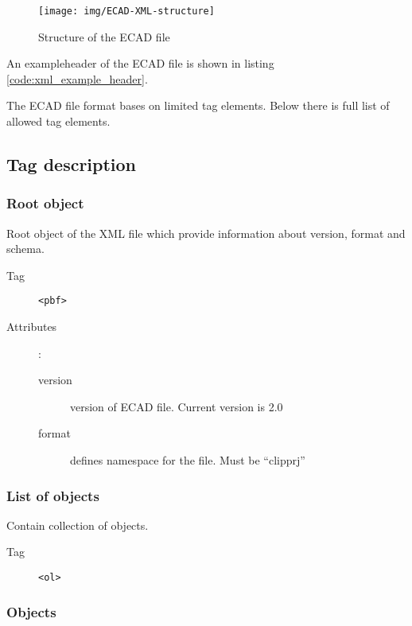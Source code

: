 \documentclass[%
	a4paper,
	oneside,
	listof=numbered,
	parskip=half,
	headsepline=true,
	footsepline=true,
	]{scrbook}
\begin{document}
\begin{figure}[!ht]
 \centering
 \texttt{[image: img/ECAD-XML-structure]}
\caption{Structure of the ECAD file}
\label{wireassist}
\end{figure}

An exampleheader of the ECAD file is shown in listing \ref{code:xml_example_header}.



The ECAD file format bases on limited tag elements. Below there is full list of allowed tag elements.

\subsection{Tag description}

\subsubsection{Root object}

Root object of the XML file which provide information about version, format and schema.

\begin{description}
	\item[Tag] \verb|<pbf>|
	\item[Attributes]:
	
	\begin{description}
		\item[version] version of ECAD file. Current version is 2.0
		\item[format] defines namespace for the file. Must be “clipprj”
	\end{description}
\end{description}

\subsubsection{List of objects}

Contain collection of objects.

\begin{description}
	\item[Tag] \verb|<ol>|
\end{description}

\subsubsection{Objects}
\end{document}
